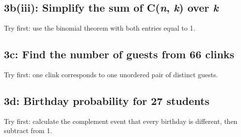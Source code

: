 \documentclass[11pt]{article}
\begin{document}
\begin{keepsection}
\begin{keepsection}
\end{keepsection}

\begin{keepsection}
\subsection{3b(iii): Simplify the sum of C(\textit{n}, \textit{k}) over \textit{k}}

Try first: use the binomial theorem with both entries equal to 1.

\end{keepsection}

\begin{keepsection}
\subsection{3c: Find the number of guests from 66 clinks}

Try first: one clink corresponds to one unordered pair of distinct guests.

\end{keepsection}

\begin{keepsection}
\subsection{3d: Birthday probability for 27 students}

Try first: calculate the complement event that every birthday is different, then subtract from 1.

\end{keepsection}
\end{keepsection}
\end{document}

